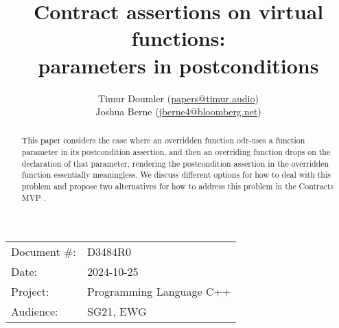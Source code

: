 

 \usepackage[bottom]{footmisc} 

 \usepackage{longtable}


\usepackage{tikz,lipsum,lmodern}
\usepackage[most]{tcolorbox}



\usepackage{titlesec}
\usepackage{tocloft}


\newcommand{\changelocaltocdepth}[1]{%
  \addtocontents{toc}{\protect\setcounter{tocdepth}{#1}}%
  \setcounter{tocdepth}{#1}%
}

\setcounter{tocdepth}{3}



\title{Contract assertions on virtual functions: \\  parameters in postconditions}
\author{
Timur Doumler \small(\href{mailto:papers@timur.audio}{papers@timur.audio}) \\
Joshua Berne \small(\href{mailto:jberne4@bloomberg.net}{jberne4@bloomberg.net}) \\
}
\date{}
\maketitle

\begin{tabular}{ll}
Document \#: & D3484R0 \\
Date: &2024-10-25 \\
Project: & Programming Language C++ \\
Audience: & SG21, EWG
\end{tabular}

\begin{abstract}
This paper considers the case where an overridden function odr-uses a function parameter in its postcondition assertion, and then an overriding function drops  on the declaration of that parameter, rendering the postcondition assertion in the overridden function essentially meaningless. We discuss different options for how to deal with this problem and propose two alternatives for how to address this problem in the Contracts MVP \cite{P2900R10}.
\end{abstract}

